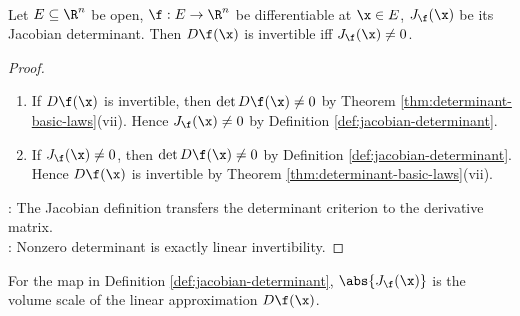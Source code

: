 \begin{corollary} \label{cor:jacobian-nonzero-iff-derivative-invertible} \\
Let $E\subseteq\R^n$ be open, $\f:E\to\R^n$ be differentiable at $\x\in E$, $J_{\f}(\x)$ be its Jacobian determinant. Then $D\f(\x)$ is invertible iff $J_{\f}(\x)\neq0$.
\begin{proof}
\begin{enumerate}[label=\roman*.]
\setlength{\itemsep}{0pt}
\item[$(\Rightarrow)$] If $D\f(\x)$ is invertible, then $\det D\f(\x)\neq0$ by Theorem \ref{thm:determinant-basic-laws}(vii). Hence $J_{\f}(\x)\neq0$ by Definition \ref{def:jacobian-determinant}.
\item[$(\Leftarrow)$] If $J_{\f}(\x)\neq0$, then $\det D\f(\x)\neq0$ by Definition \ref{def:jacobian-determinant}. Hence $D\f(\x)$ is invertible by Theorem \ref{thm:determinant-basic-laws}(vii).
\end{enumerate}
: The Jacobian definition transfers the determinant criterion to the derivative matrix.\\
: Nonzero determinant is exactly linear invertibility.
\end{proof}
\end{corollary}

\noindent For the map in Definition \ref{def:jacobian-determinant}, $\abs{J_{\f}(\x)}$ is the volume scale of the linear approximation $D\f(\x)$.
